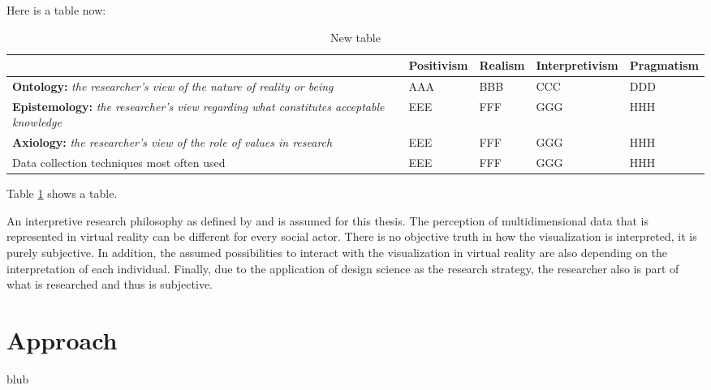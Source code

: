 Here is a table now:
\begin{table}[h!]
	\begin{center}
		\caption{New table}
		\label{tbl:table1}
		\begin{tabular}{ | p{2.8cm} | l | l | l | l |} 
			\hline
			& \textbf{Positivism} & \textbf{Realism} & \textbf{Interpretivism} & \textbf{Pragmatism} \\ \hline
			\textbf{Ontology:} \textit{the researcher's view of the nature of reality or being} & AAA & BBB & CCC & DDD  \\ \hline
			\textbf{Epistemology:} \textit{the researcher's view regarding what constitutes acceptable knowledge} & EEE & FFF & GGG & HHH \\
			\hline
			\textbf{Axiology:} \textit{the researcher's view of the role of values in research} & EEE & FFF & GGG & HHH \\ 
			\hline
			Data collection techniques most often used & EEE & FFF & GGG & HHH \\ 
			\hline
		\end{tabular}
	\end{center}
\end{table}


	
	Table \ref{tbl:table1} shows a table.

An interpretive research philosophy as defined by \cite{Vaishnavi2007} and \cite{Saunders2009} is assumed for this thesis.
The perception of multidimensional data that is represented in virtual reality can be different for every social actor. There is no objective truth in how the visualization is interpreted, it is purely subjective. In addition, the assumed possibilities to interact with the visualization in virtual reality are also depending on the interpretation of each individual. Finally, due to the application of design science as the research strategy, the researcher also is part of what is researched and thus is subjective.



\section{Approach}

blub


